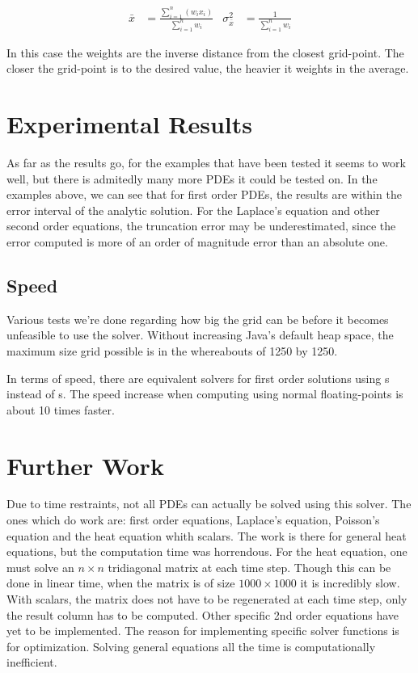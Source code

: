 \begin{align*}
    \bar{x} & = \frac{\sum_{i=1}^n(w_ix_i)}{\sum_{i=1}^n w_i}&
    \sigma^2_{\bar{x}}& = \frac{1}{\sum_{i=1}^n w_i}
\end{align*}

In this case the weights are the inverse distance from the closest
grid-point. The closer the grid-point is to the desired value, the
heavier it weights in the average.
\section{Experimental Results}
As far as the results go, for the examples that have been tested it
seems to work well, but there is admitedly many more PDEs it could be
tested on. In the examples above, we can see that for first order
PDEs, the results are within the error interval of the analytic solution. For
the Laplace's equation and other second order equations, the
truncation error may be underestimated, since the error computed is
more of an order of magnitude error than an absolute one.

\subsection{Speed}
Various tests we're done regarding how big the grid can be before it
becomes unfeasible to use the solver. Without increasing Java's
default heap space, the maximum size grid possible is in the
whereabouts of 1250 by 1250.

In terms of speed, there are equivalent solvers for first order
solutions using s instead of s. The
speed increase when computing using normal floating-points is about 10
times faster.

\section{Further Work}
Due to time restraints, not all PDEs can actually be solved using this
solver. The ones which do work are: first order equations, Laplace's
equation, Poisson's equation and the heat equation whith scalars. The
work is there for general heat equations, but the computation time was
horrendous. For the heat equation, one must solve an $n\times n$
tridiagonal matrix at each time step. Though this can be done in
linear time, when the matrix is of size $1000\times1000$ it is
incredibly slow. With scalars, the matrix does not have to be
regenerated at each time step, only the result column has to be
computed. Other specific 2nd order equations have yet to be
implemented. The reason for implementing specific solver functions is
for optimization. Solving general equations all the time is
computationally inefficient.

